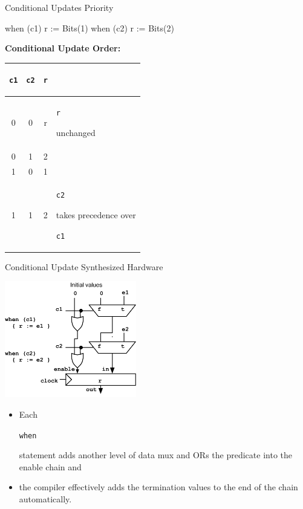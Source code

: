 \documentclass[xcolor=pdflatex,dvipsnames,table]{beamer}
\newcommand{\code}[1]{\begin{footnotesize}{\tt #1}\end{footnotesize}}
\begin{document}
\begin{frame}[fragile]{Conditional Updates Priority}

\begin{scala}
when (c1) { r := Bits(1) }
when (c2) { r := Bits(2) }
\end{scala}

\textbf{Conditional Update Order:}

\begin{center}
\begin{tabular}{|c|c|c|l|}
\hline
\code{c1} & \code{c2}  &  \code{r} & \\
\hline
0 &  0 & r &  \code{r} unchanged \\
0 &  1 & 2 & \\
1 &  0 & 1 & \\
1 &  1 & 2& \code{c2} takes precedence over \code{c1} \\
\hline
\end{tabular}
\end{center}

\end{frame}

\begin{frame}[fragile]{Conditional Update Synthesized Hardware}

\begin{center}
\includegraphics[height=2in]{figs/condupdates.pdf}
\end{center}

\begin{itemize}
\item Each \code{when} statement adds another level of data mux and ORs
  the predicate into the enable chain and
\item the compiler effectively adds
  the termination values to the end of the chain automatically.
\end{itemize}

\end{frame}
\end{document}
